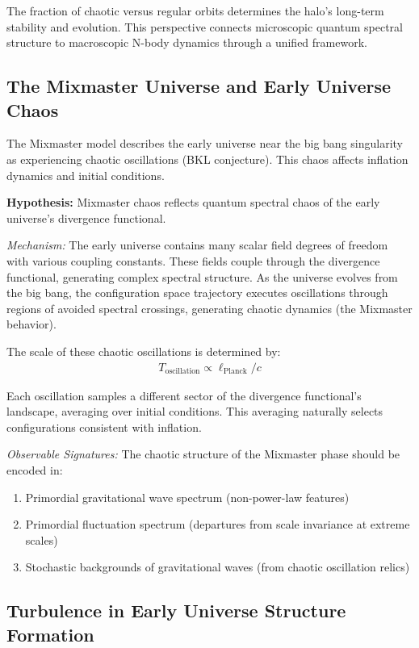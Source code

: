 \documentclass[12pt,a4paper]{article}
\begin{document}
The fraction of chaotic versus regular orbits determines the halo's long-term stability and evolution. This perspective connects microscopic quantum spectral structure to macroscopic N-body dynamics through a unified framework.

\subsection{The Mixmaster Universe and Early Universe Chaos}

The Mixmaster model describes the early universe near the big bang singularity as experiencing chaotic oscillations (BKL conjecture). This chaos affects inflation dynamics and initial conditions.

\textbf{Hypothesis:} Mixmaster chaos reflects quantum spectral chaos of the early universe's divergence functional.

\textit{Mechanism:} The early universe contains many scalar field degrees of freedom with various coupling constants. These fields couple through the divergence functional, generating complex spectral structure. As the universe evolves from the big bang, the configuration space trajectory executes oscillations through regions of avoided spectral crossings, generating chaotic dynamics (the Mixmaster behavior).

The scale of these chaotic oscillations is determined by:
\begin{align}
T_{\text{oscillation}} \propto \ell_{\text{Planck}} / c
\end{align}

Each oscillation samples a different sector of the divergence functional's landscape, averaging over initial conditions. This averaging naturally selects configurations consistent with inflation.

\textit{Observable Signatures:} The chaotic structure of the Mixmaster phase should be encoded in:
\begin{enumerate}
\item Primordial gravitational wave spectrum (non-power-law features)
\item Primordial fluctuation spectrum (departures from scale invariance at extreme scales)
\item Stochastic backgrounds of gravitational waves (from chaotic oscillation relics)
\end{enumerate}

\subsection{Turbulence in Early Universe Structure Formation}
\end{document}
